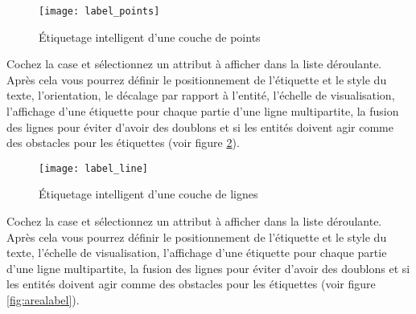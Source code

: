 \begin{figure}[ht]
\centering
   \texttt{[image: label\_points]}
   \caption{Étiquetage intelligent d'une couche de points \nixcaption}\label{fig:pointlabel}
\end{figure}


Cochez la case  et sélectionnez un attribut à afficher dans la liste déroulante. Après cela vous pourrez définir le positionnement de l'étiquette et le style du texte, l'orientation, le décalage par rapport à l'entité, l'échelle de visualisation, l'affichage d'une étiquette pour chaque partie d'une ligne multipartite, la fusion des lignes pour éviter d'avoir des doublons et si les entités doivent agir comme des obstacles pour les étiquettes (voir figure \ref{fig:linelabel}).

\begin{figure}[ht]
\centering
   \texttt{[image: label\_line]}
   \caption{Étiquetage intelligent d'une couche de lignes \nixcaption}\label{fig:linelabel}
\end{figure}


Cochez la case  et sélectionnez un attribut à afficher dans la liste déroulante. Après cela vous pourrez définir le positionnement de l'étiquette et le style du texte, l'échelle de visualisation, l'affichage d'une étiquette pour chaque partie d'une ligne multipartite, la fusion des lignes pour éviter d'avoir des doublons et si les entités doivent agir comme des obstacles pour les étiquettes (voir figure \ref{fig:arealabel}).

